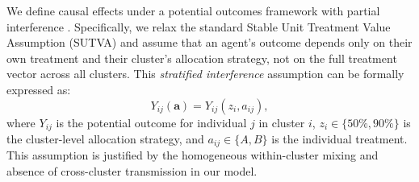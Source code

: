 


\begin{abstract}
...
\textbf{Results:}
The two-stage design successfully estimated direct effects of treatment choice (no
differential mortality between drugs across strategies) and indirect effects via altered
population transmission dynamics. Under the high-use Drug B strategy (50/50), there were
fewer deaths overall (estimated 596 vs.\ 864 deaths under 90/10), driven by reduced
resistant-strain mortality. However, this strategy paradoxically increased the cumulative
incidence of susceptible infections (+3.2\%, 95\% simulation interval [+1.8\%, +4.6\%])
due to reduced competitive exclusion when resistant-strain prevalence declined. This
spillover effect---a key finding---would be undetectable in individually randomized trials
but emerges naturally from the two-stage design by contrasting cluster-level strategies.
...
\end{abstract}



We define causal effects under a potential outcomes framework with partial interference
\citep{hudgens2008toward, vanderweele2011social}. Specifically, we relax the standard
Stable Unit Treatment Value Assumption (SUTVA) and assume that an agent's outcome depends
only on their own treatment and their cluster's allocation strategy, not on the full
treatment vector across all clusters. This \textit{stratified interference} assumption
can be formally expressed as:
\begin{equation}
Y_{ij}(\mathbf{a}) = Y_{ij}(z_i, a_{ij}),
\end{equation}
where $Y_{ij}$ is the potential outcome for individual $j$ in cluster $i$, $z_i \in \{50\%, 90\%\}$
is the cluster-level allocation strategy, and $a_{ij} \in \{A, B\}$ is the individual treatment.
This assumption is justified by the homogeneous within-cluster mixing and absence of cross-cluster
transmission in our model.

